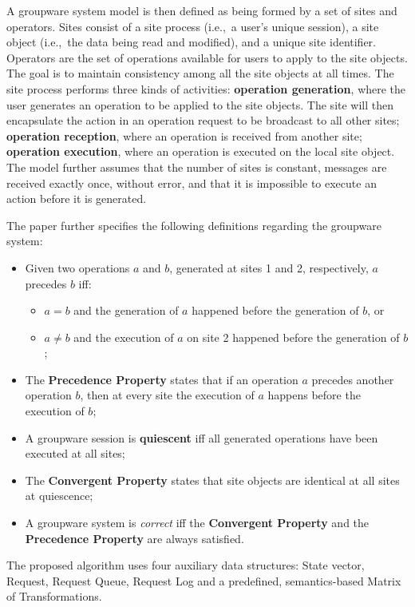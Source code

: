 A groupware system model is then defined as being formed by a set of sites and operators. Sites consist of a site process (i.e.,\ a user's unique session), a site object (i.e.,\ the data being read and modified), and a unique site identifier. Operators are the set of operations available for users to apply to the site objects. The goal is to maintain consistency among all the site objects at all times. The site process performs three kinds of activities: \textbf{operation generation}, where the user generates an operation to be applied to the site objects. The site will then encapsulate the action in an operation request to be broadcast to all other sites; \textbf{operation reception}, where an operation is received from another site; \textbf{operation execution}, where an operation is executed on the local site object. The model further assumes that the number of sites is constant, messages are received exactly once, without error, and that it is impossible to execute an action before it is generated.

The paper further specifies the following definitions regarding the groupware system:

\begin{itemize}
    \item Given two operations $a$ and $b$, generated at sites 1 and 2, respectively, $a$ precedes $b$ iff:
    \begin{itemize}
        \item $a = b$ and the generation of $a$ happened before the generation of $b$, or
        \item $a \neq b$ and the execution of $a$ on site 2 happened before the generation of $b$;
    \end{itemize}
    \item The \textbf{Precedence Property} states that if an operation $a$ precedes another operation $b$, then at every site the execution of $a$ happens before the execution of $b$;
    \item A groupware session is \textbf{quiescent} iff all generated operations have been executed at all sites;
    \item The \textbf{Convergent Property} states that site objects are identical at all sites at quiescence;
    \item A groupware system is \textit{correct} iff the \textbf{Convergent Property} and the \textbf{Precedence Property} are always satisfied.
\end{itemize}

The proposed algorithm uses four auxiliary data structures: State vector, Request, Request Queue, Request Log and a predefined, semantics-based Matrix of Transformations. 

